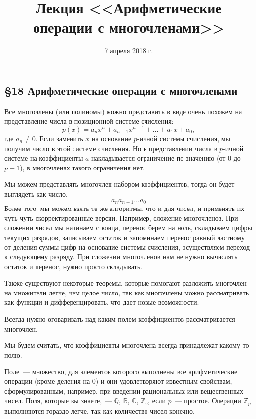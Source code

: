 \documentclass[russian]{lecture-notes}
\title{Лекция <<Арифметические операции с многочленами>>}
\date{7 апреля 2018 г.}
\theoremstyle{definition}
\begin{document}
    \maketitle

    \begin{center}
        \section*{\LARGE\S 18 Арифметические операции с многочленами}
        \label{par:mnogoch}
    \end{center}

    \noindent Все многочлены (или полиномы) можно представить в виде очень похожем на представление числа в позиционной системе счисления:
    \[ p(x) = a_nx^n + a_{n-1}x^{n-1} + \ldots + a_1x + a_0, \]
    где $a_n \ne 0$. Если заменить $x$ на основание $p$-ичной системы счисления, мы получим число в этой системе счисления. Но в представлении числа в $p$-ичной системе на коэффициенты $a$ накладывается ограничение по значению (от $0$ до $p-1$), в многочленах такого ограничения нет.

    Мы можем представлять многочлен набором коэффициентов, тогда он будет выглядеть как число.
    \[
        a_na_{n-1} \ldots a_0
    \]
    Более того, мы можем взять те же алгоритмы, что и для чисел, и применять их чуть-чуть скорректированные версии. Например, сложение многочленов. При сложении чисел мы начинаем с конца, перенос берем на ноль, складываем цифры текущих разрядов, записываем остаток и запоминаем перенос равный частному от деления суммы цифр на основание системы счисления, осуществляем переход к следующему разряду. При сложении многочленов нам не нужно вычислять остаток и перенос, нужно просто складывать.

    Также существуют некоторые теоремы, которые помогают разложить многочлен на множители легче, чем целое число, так как многочлены можно рассматривать как функции и дифференцировать, что дает новые возможности.

    \begin{remark}
        Всегда нужно оговаривать над каким полем коэффициентов рассматривается многочлен.

        Мы будем считать, что коэффициенты многочлена всегда принадлежат какому-то полю.
    \end{remark}

    \begin{note}
        Поле~--- множество, для элементов которого выполнены все арифметические операции (кроме деления на $0$) и они удовлетворяют известным свойствам, сформулированным, например, при введении рациональных или вещественных чисел. Поля, которые вы знаете,~--- $\mathbb{Q}$, $\mathbb{R}$, $\mathbb{C}$, $\mathbb{Z}_p$, если $p$~--- простое. Операции $\mathbb{Z}_p$ выполняются гораздо легче, так как количество чисел конечно.
    \end{note}
\end{document}
